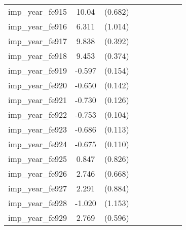 {\begin{tabular}{l*{4}{cc}}
imp\_year\_fe915&    10.04\sym{***}&  (0.682)&                  &         &                  &         &                  &         \\
imp\_year\_fe916&    6.311\sym{***}&  (1.014)&                  &         &                  &         &                  &         \\
imp\_year\_fe917&    9.838\sym{***}&  (0.392)&                  &         &                  &         &                  &         \\
imp\_year\_fe918&    9.453\sym{***}&  (0.374)&                  &         &                  &         &                  &         \\
imp\_year\_fe919&   -0.597\sym{***}&  (0.154)&                  &         &                  &         &                  &         \\
imp\_year\_fe920&   -0.650\sym{***}&  (0.142)&                  &         &                  &         &                  &         \\
imp\_year\_fe921&   -0.730\sym{***}&  (0.126)&                  &         &                  &         &                  &         \\
imp\_year\_fe922&   -0.753\sym{***}&  (0.104)&                  &         &                  &         &                  &         \\
imp\_year\_fe923&   -0.686\sym{***}&  (0.113)&                  &         &                  &         &                  &         \\
imp\_year\_fe924&   -0.675\sym{***}&  (0.110)&                  &         &                  &         &                  &         \\
imp\_year\_fe925&    0.847         &  (0.826)&                  &         &                  &         &                  &         \\
imp\_year\_fe926&    2.746\sym{***}&  (0.668)&                  &         &                  &         &                  &         \\
imp\_year\_fe927&    2.291\sym{**} &  (0.884)&                  &         &                  &         &                  &         \\
imp\_year\_fe928&   -1.020         &  (1.153)&                  &         &                  &         &                  &         \\
imp\_year\_fe929&    2.769\sym{***}&  (0.596)&                  &         &                  &         &                  &         \\

\end{tabular}}
